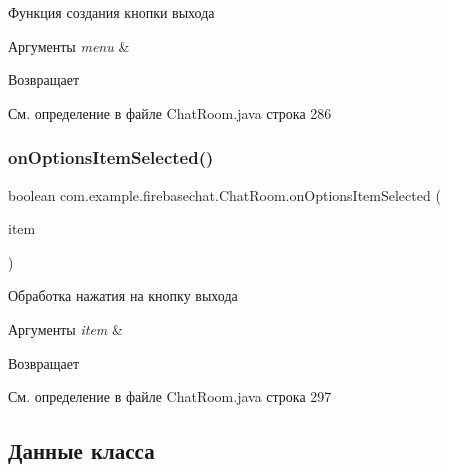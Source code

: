 Функция создания кнопки выхода 


\begin{DoxyParams}{Аргументы}
{\em menu} & \\
\hline
\end{DoxyParams}
\begin{DoxyReturn}{Возвращает}

\end{DoxyReturn}


См. определение в файле Chat\+Room.\+java строка 286

\mbox{\label{classcom_1_1example_1_1firebasechat_1_1_chat_room_a278ca3b8374bddc73823cf42eeb62ba2}} 
\subsubsection{\texorpdfstring{on\+Options\+Item\+Selected()}{onOptionsItemSelected()}}
{\footnotesize\ttfamily boolean com.\+example.\+firebasechat.\+Chat\+Room.\+on\+Options\+Item\+Selected (\begin{DoxyParamCaption}\item[{Menu\+Item}]{item }\end{DoxyParamCaption})}



Обработка нажатия на кнопку выхода 


\begin{DoxyParams}{Аргументы}
{\em item} & \\
\hline
\end{DoxyParams}
\begin{DoxyReturn}{Возвращает}

\end{DoxyReturn}


См. определение в файле Chat\+Room.\+java строка 297



\subsection{Данные класса}
\mbox{\label{classcom_1_1example_1_1firebasechat_1_1_chat_room_aea339a52dcfcefb9f710a47548f37fed}} 
